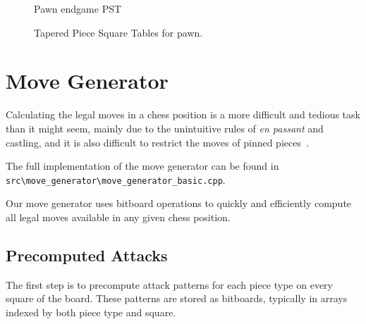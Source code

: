 \begin{figure}[H]
\begin{minipage}{0.4\textwidth}
        \caption*{Pawn endgame PST}
    \end{minipage}
    \caption{Tapered Piece Square Tables for pawn.}\label{fig:taperedPSTpawns}
\end{figure}

\section{Move Generator}

Calculating the legal moves in a chess position is a more difficult and tedious task
than it might seem, mainly due to the unintuitive rules of \textit{en passant} and castling,
and it is also difficult to restrict the moves of pinned pieces~\cite{GenerateLegalMovesEfficiently}.

\vspace{1em}

\noindent \parbox{\textwidth}{The full implementation of the move generator can be found in \texttt{src\textbackslash{}move\_generator\textbackslash{}move\_generator\_basic.cpp}.}

\vspace{1em}

\noindent Our move generator uses bitboard operations to quickly and efficiently compute all legal moves available in any given chess position.

\subsection{Precomputed Attacks}

\noindent The first step is to precompute attack patterns for each piece type on every square of the board. These patterns are stored as bitboards, typically in arrays indexed by both piece type and square.

